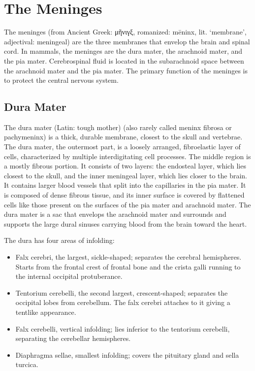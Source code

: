 \documentclass[]{book}
\providecommand{\tightlist}{%
  \setlength{\itemsep}{0pt}\setlength{\parskip}{0pt}}
\begin{document}
\hypertarget{the-meninges}{%
\section{The Meninges}\label{the-meninges}}

The meninges (from Ancient Greek: μῆνιγξ, romanized: mēninx, lit. `membrane', adjectival: meningeal) are the three membranes that envelop the brain and spinal cord. In mammals, the meninges are the dura mater, the arachnoid mater, and the pia mater. Cerebrospinal fluid is located in the subarachnoid space between the arachnoid mater and the pia mater. The primary function of the meninges is to protect the central nervous system.

\hypertarget{dura-mater}{%
\subsection{Dura Mater}\label{dura-mater}}

The dura mater (Latin: tough mother) (also rarely called meninx fibrosa or pachymeninx) is a thick, durable membrane, closest to the skull and vertebrae. The dura mater, the outermost part, is a loosely arranged, fibroelastic layer of cells, characterized by multiple interdigitating cell processes. The middle region is a mostly fibrous portion. It consists of two layers: the endosteal layer, which lies closest to the skull, and the inner meningeal layer, which lies closer to the brain. It contains larger blood vessels that split into the capillaries in the pia mater. It is composed of dense fibrous tissue, and its inner surface is covered by flattened cells like those present on the surfaces of the pia mater and arachnoid mater. The dura mater is a sac that envelops the arachnoid mater and surrounds and supports the large dural sinuses carrying blood from the brain toward the heart.

The dura has four areas of infolding:

\begin{itemize}
\tightlist
\item
  Falx cerebri, the largest, sickle-shaped; separates the cerebral hemispheres. Starts from the frontal crest of frontal bone and the crista galli running to the internal occipital protuberance.
\item
  Tentorium cerebelli, the second largest, crescent-shaped; separates the occipital lobes from cerebellum. The falx cerebri attaches to it giving a tentlike appearance.
\item
  Falx cerebelli, vertical infolding; lies inferior to the tentorium cerebelli, separating the cerebellar hemispheres.
\item
  Diaphragma sellae, smallest infolding; covers the pituitary gland and sella turcica.
\end{itemize}
\end{document}
